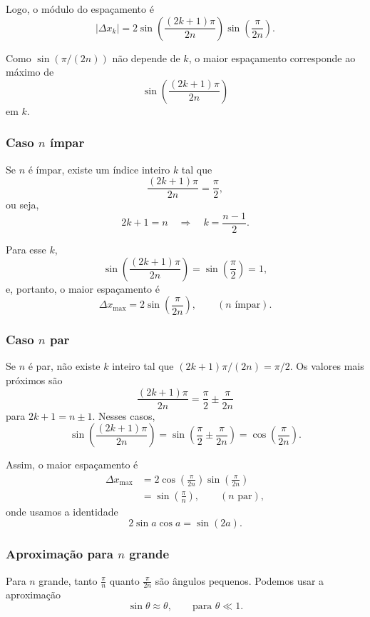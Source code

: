 \documentclass[12pt,a4paper]{article}
\begin{document}
Logo, o módulo do espaçamento é
\[
  |\Delta x_k|
  = 2 \sin\!\left(\frac{(2k+1)\pi}{2n}\right)\sin\!\left(\frac{\pi}{2n}\right).
\]

Como $\sin(\pi/(2n))$ não depende de $k$, o maior espaçamento corresponde
ao máximo de
\[
  \sin\!\left(\frac{(2k+1)\pi}{2n}\right)
\]
em $k$.

\subsubsection{Caso $n$ ímpar}

Se $n$ é ímpar, existe um índice inteiro $k$ tal que
\[
  \frac{(2k+1)\pi}{2n} = \frac{\pi}{2},
\]
ou seja,
\[
  2k+1 = n \quad\Longrightarrow\quad k = \frac{n-1}{2}.
\]

Para esse $k$,
\[
  \sin\!\left(\frac{(2k+1)\pi}{2n}\right)
  = \sin\!\left(\frac{\pi}{2}\right) = 1,
\]
e, portanto, o maior espaçamento é
\[
  \Delta x_{\max}
  = 2 \sin\!\left(\frac{\pi}{2n}\right), \qquad (n \text{ ímpar}).
\]

\subsubsection{Caso $n$ par}

Se $n$ é par, não existe $k$ inteiro tal que $(2k+1)\pi/(2n) = \pi/2$.
Os valores mais próximos são
\[
  \frac{(2k+1)\pi}{2n} = \frac{\pi}{2} \pm \frac{\pi}{2n}
\]
para $2k+1 = n \pm 1$.
Nesses casos,
\[
  \sin\!\left(\frac{(2k+1)\pi}{2n}\right)
  = \sin\!\left(\frac{\pi}{2} \pm \frac{\pi}{2n}\right)
  = \cos\!\left(\frac{\pi}{2n}\right).
\]

Assim, o maior espaçamento é
\begin{align*}
  \Delta x_{\max}
  &= 2 \cos\!\left(\frac{\pi}{2n}\right)
       \sin\!\left(\frac{\pi}{2n}\right) \\
  &= \sin\!\left(\frac{\pi}{n}\right), \qquad (n \text{ par}),
\end{align*}
onde usamos a identidade
\[
  2 \sin a \cos a = \sin(2a).
\]

\subsubsection{Aproximação para $n$ grande}

Para $n$ grande, tanto $\frac{\pi}{n}$ quanto $\frac{\pi}{2n}$ são ângulos pequenos.
Podemos usar a aproximação
\[
  \sin \theta \approx \theta, \qquad \text{para } \theta \ll 1.
\]
\end{document}
